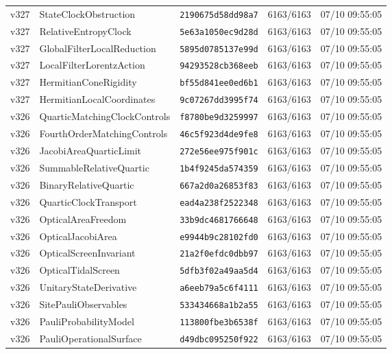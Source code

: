 \documentclass[11pt]{article}
\theoremstyle{definition}\newtheorem{deriv}{Derivação}
\begin{document}
{\begin{longtable}{@{}lllll@{}}
v327 & StateClockObstruction & \texttt{2190675d58dd98a7} & 6163/6163 & 07/10 09:55:05 \\
v327 & RelativeEntropyClock & \texttt{5e63a1050ec9d28d} & 6163/6163 & 07/10 09:55:05 \\
v327 & GlobalFilterLocalReduction & \texttt{5895d0785137e99d} & 6163/6163 & 07/10 09:55:05 \\
v327 & LocalFilterLorentzAction & \texttt{94293528cb368eeb} & 6163/6163 & 07/10 09:55:05 \\
v327 & HermitianConeRigidity & \texttt{bf55d841ee0ed6b1} & 6163/6163 & 07/10 09:55:05 \\
v327 & HermitianLocalCoordinates & \texttt{9c07267dd3995f74} & 6163/6163 & 07/10 09:55:05 \\
v326 & QuarticMatchingClockControls & \texttt{f8780be9d3259997} & 6163/6163 & 07/10 09:55:05 \\
v326 & FourthOrderMatchingControls & \texttt{46c5f923d4de9fe8} & 6163/6163 & 07/10 09:55:05 \\
v326 & JacobiAreaQuarticLimit & \texttt{272e56ee975f901c} & 6163/6163 & 07/10 09:55:05 \\
v326 & SummableRelativeQuartic & \texttt{1b4f9245da574359} & 6163/6163 & 07/10 09:55:05 \\
v326 & BinaryRelativeQuartic & \texttt{667a2d0a26853f83} & 6163/6163 & 07/10 09:55:05 \\
v326 & QuarticClockTransport & \texttt{ead4a238f2522348} & 6163/6163 & 07/10 09:55:05 \\
v326 & OpticalAreaFreedom & \texttt{33b9dc4681766648} & 6163/6163 & 07/10 09:55:05 \\
v326 & OpticalJacobiArea & \texttt{e9944b9c28102fd0} & 6163/6163 & 07/10 09:55:05 \\
v326 & OpticalScreenInvariant & \texttt{21a2f0efdc0dbb97} & 6163/6163 & 07/10 09:55:05 \\
v326 & OpticalTidalScreen & \texttt{5dfb3f02a49aa5d4} & 6163/6163 & 07/10 09:55:05 \\
v326 & UnitaryStateDerivative & \texttt{a6eeb79a5c6f4111} & 6163/6163 & 07/10 09:55:05 \\
v326 & SitePauliObservables & \texttt{533434668a1b2a55} & 6163/6163 & 07/10 09:55:05 \\
v326 & PauliProbabilityModel & \texttt{113800fbe3b6538f} & 6163/6163 & 07/10 09:55:05 \\
v326 & PauliOperationalSurface & \texttt{d49dbc095250f922} & 6163/6163 & 07/10 09:55:05 \\

\end{longtable}}
\end{document}
